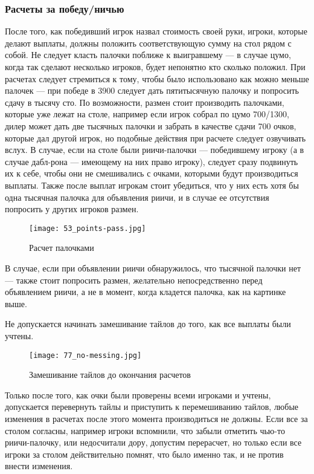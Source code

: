 \subsubsection{Расчеты за победу/ничью}

После того, как победивший игрок назвал стоимость своей руки, игроки, которые делают выплаты, должны положить соответствующую сумму на стол рядом с собой. Не следует класть палочки поближе к выигравшему --- в случае цумо, когда так сделают несколько игроков, будет непонятно кто сколько положил. При расчетах следует стремиться к тому, чтобы было использовано как можно меньше палочек --- при победе в 3900 следует дать пятитысячную палочку и попросить сдачу в тысячу сто. По возможности, размен стоит производить палочками, которые уже лежат на столе, например если игрок собрал по цумо 700/1300, дилер может дать две тысячных палочки и забрать в качестве сдачи 700 очков, которые дал другой игрок, но подобные действия при расчете следует озвучивать вслух. В случае, если на столе были риичи-палочки --- победившему игроку (а в случае дабл-рона --- имеющему на них право игроку), следует сразу подвинуть их к себе, чтобы они не смешивались с очками, которыми будут производиться выплаты. Также после выплат игрокам стоит убедиться, что у них есть хотя бы одна тысячная палочка для объявления риичи, и в случае ее отсутствия попросить у других игроков размен.

\begin{figure}[H]
	\centering
	\texttt{[image: 53\_points-pass.jpg]}
	\caption{Расчет палочками}
\end{figure}

В случае, если при объявлении риичи обнаружилось, что тысячной палочки нет --- также стоит попросить размен, желательно непосредственно перед объявлением риичи, а не в момент, когда кладется палочка, как на картинке выше.

Не допускается начинать замешивание тайлов до того, как все выплаты были учтены.

\begin{figure}[H]
	\centering
	\texttt{[image: 77\_no-messing.jpg]}
	\caption{Замешивание тайлов до окончания расчетов}
\end{figure}

Только после того, как очки были проверены всеми игроками и учтены, допускается перевернуть тайлы и приступить к перемешиванию тайлов, любые изменения в расчетах после этого момента производиться не должны. Если все за столом согласны, например игроки вспомнили, что забыли отметить чью-то риичи-палочку, или недосчитали дору, допустим перерасчет, но только если все игроки за столом действительно помнят, что было именно так, и не против внести изменения.

